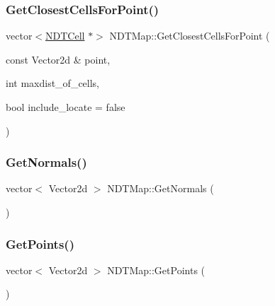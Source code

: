 \mbox{\label{classNDTMap_a0a4879ae61a1e3e8d634cbca02bfd9ce}} 
\subsubsection{\texorpdfstring{Get\+Closest\+Cells\+For\+Point()}{GetClosestCellsForPoint()}}
{\footnotesize\ttfamily vector$<$\hyperlink{classNDTCell}{N\+D\+T\+Cell} $\ast$$>$ N\+D\+T\+Map\+::\+Get\+Closest\+Cells\+For\+Point (\begin{DoxyParamCaption}\item[{const Vector2d \&}]{point,  }\item[{int}]{maxdist\+\_\+of\+\_\+cells,  }\item[{bool}]{include\+\_\+locate = {\ttfamily false} }\end{DoxyParamCaption})\hspace{0.3cm}{\ttfamily [inline]}}

\mbox{\label{classNDTMap_a81de728bee39e48fefcb92a893f53611}} 
\subsubsection{\texorpdfstring{Get\+Normals()}{GetNormals()}}
{\footnotesize\ttfamily vector$<$ Vector2d $>$ N\+D\+T\+Map\+::\+Get\+Normals (\begin{DoxyParamCaption}{ }\end{DoxyParamCaption})}

\mbox{\label{classNDTMap_afbeaa3c223cb78b970601c31eebb8b8d}} 
\subsubsection{\texorpdfstring{Get\+Points()}{GetPoints()}}
{\footnotesize\ttfamily vector$<$ Vector2d $>$ N\+D\+T\+Map\+::\+Get\+Points (\begin{DoxyParamCaption}{ }\end{DoxyParamCaption})}

